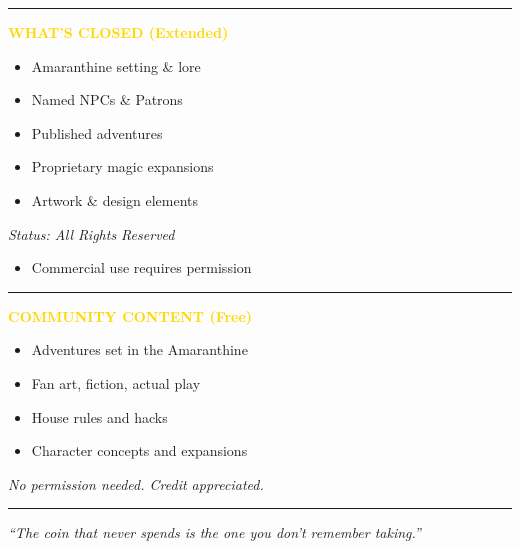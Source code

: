 \documentclass[10pt]{article}
\newenvironment{cardbox}[2]{
  \begin{minipage}[t]{0.9\linewidth}
  \noindent
  \textcolor{#2}{\rule{4pt}{\dimexpr\height+4pt\relax}}%
  \hspace{6pt}%
  \textbf{\textcolor{gold}{#1}}\par
  \vspace{2pt}
}{
  \end{minipage}
}
\begin{document}
\begin{center}
\begin{minipage}{0.95\linewidth}
{\begin{minipage}{0.98\linewidth}
\begin{minipage}{0.95\linewidth}
          \vspace{0.1in}

          \begin{cardbox}{WHAT'S CLOSED (Extended)}{borderclosed}
            \small
            \begin{itemize}[leftmargin=*, itemsep=1pt, label=\textcolor{borderclosed}{\texttimes}]
              \item Amaranthine setting \& lore
              \item Named NPCs \& Patrons
              \item Published adventures
              \item Proprietary magic expansions
              \item Artwork \& design elements
            \end{itemize}
            \vspace{2pt}
            \textit{\textcolor{textmuted}{Status: All Rights Reserved}}
            \begin{itemize}[leftmargin=*, itemsep=1pt, label=\textcolor{textmuted}{•}]
              \item Commercial use requires permission
            \end{itemize}
          \end{cardbox}

          \vspace{0.1in}

          \begin{cardbox}{COMMUNITY CONTENT (Free)}{borderfree}
            \small
            \begin{itemize}[leftmargin=*, itemsep=1pt, label=\textcolor{borderfree}{\textbullet}]
              \item Adventures set in the Amaranthine
              \item Fan art, fiction, actual play
              \item House rules and hacks
              \item Character concepts and expansions
            \end{itemize}
            \vspace{2pt}
            \textit{\textcolor{textmuted}{No permission needed. Credit appreciated.}}
          \end{cardbox}

        \end{minipage}

        \vspace{0.15in}
        \rule{0.6\linewidth}{0.4pt}
        \vspace{0.1in}

        {\small \textit{\textcolor{textmuted}{``The coin that never spends is the one you don't remember taking.''}}}

        \vspace{0.1in}
      \end{minipage}
    }
  \end{minipage}
\end{center}
\end{document}
